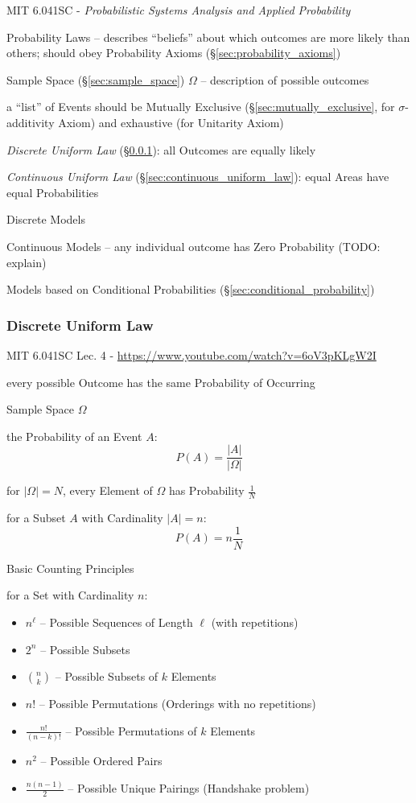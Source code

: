 \asterism

MIT 6.041SC - \emph{Probabilistic Systems Analysis and Applied Probability}

Probability Laws -- describes ``beliefs'' about which outcomes are more likely
than others; should obey Probability Axioms (\S\ref{sec:probability_axioms})

Sample Space (\S\ref{sec:sample_space}) $\Omega$ -- description of possible
outcomes

a ``list'' of Events should be Mutually Exclusive
(\S\ref{sec:mutually_exclusive}, for $\sigma$-additivity Axiom) and exhaustive
(for Unitarity Axiom)

\emph{Discrete Uniform Law} (\S\ref{sec:discrete_uniform_law}): all Outcomes are
equally likely

\emph{Continuous Uniform Law} (\S\ref{sec:continuous_uniform_law}): equal Areas
have equal Probabilities

Discrete Models

Continuous Models -- any individual outcome has Zero Probability (TODO: explain)

Models based on Conditional Probabilities (\S\ref{sec:conditional_probability})



\subsubsection{Discrete Uniform Law}\label{sec:discrete_uniform_law}

MIT 6.041SC Lec. 4 - \url{https://www.youtube.com/watch?v=6oV3pKLgW2I}

every possible Outcome has the same Probability of Occurring

Sample Space $\Omega$

the Probability of an Event $A$:
\[
  P(A) = \frac{|A|}{|\Omega|}
\]

for $|\Omega| = N$, every Element of $\Omega$ has Probability $\frac{1}{N}$

for a Subset $A$ with Cardinality $|A| = n$:
\[
  P(A) = n \frac{1}{N}
\]


Basic Counting Principles

for a Set with Cardinality $n$:
\begin{itemize}
  \item $n^\ell$ -- Possible Sequences of Length $\ell$ (with repetitions)
  \item $2^n$ -- Possible Subsets
  \item $\binom{n}{k}$ -- Possible Subsets of $k$ Elements
  \item $n!$ -- Possible Permutations (Orderings with no repetitions)
  \item $\frac{n!}{(n-k)!}$ -- Possible Permutations of $k$ Elements
  \item $n^2$ -- Possible Ordered Pairs
  \item $\frac{n(n-1)}{2}$ -- Possible Unique Pairings (Handshake problem)
\end{itemize}


